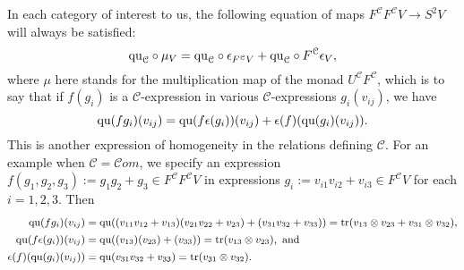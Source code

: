 \documentclass[11pt]{amsart}
\theoremstyle{plain}
\theoremstyle{definition}
\DeclareMathOperator{\trace}{tr}
\renewcommand{\to}{\longrightarrow}
\newcommand{\scrC}{\mathscr{C}}
\newcommand{\calc}{\mathcal{C}}
\theoremstyle{plain}
\newcommand{\quadratic}{\textup{qu}}
\newcommand{\algs}{{\scrC\!\textit{om}}}
\begin{document}
\begin{CPiAlgs and CHalgs}
In each category of interest to us, the following equation of maps $F^\calc F^\calc V\to S^2 V$ will always be satisfied:
\[\quadratic_\calc\circ\mu_V=\quadratic_\calc\circ \epsilon_{F^\calc V} +\quadratic_\calc\circ {F^\calc \epsilon_V},\]
where $\mu$ here stands for the multiplication map of the monad $U^\calc F^\calc $, which is to say that if  $f(g_i)$ is a $\calc$-expression in various $\calc$-expressions $g_i(v_{ij})$, we have 
\[\quadratic(fg_i)(v_{ij})=\quadratic(f\epsilon(g_i))(v_{ij})+\epsilon(f)(\quadratic(g_i)(v_{ij})).\]
This is another expression of homogeneity in the relations defining $\calc$. For an example when $\calc=\algs$, we specify an expression $f(g_1,g_2,g_3):=g_1g_2+g_3\in F^\calc F^\calc V$ in expressions $g_i:=v_{i1}v_{i2}+v_{i3}\in F^\calc V$ for each $i=1,2,3$. Then
\begin{alignat*}{2}
\textup{\small$\quadratic(fg_i)(v_{ij})={}$}
&
\textup{\small$\quadratic((v_{11}v_{12}+v_{13})(v_{21}v_{22}+v_{23})+(v_{31}v_{32}+v_{33}))=\trace(v_{13}\otimes v_{23}+v_{31}\otimes v_{32}),$}
\\
\textup{\small$\quadratic(f\epsilon(g_i))(v_{ij})={}$}
&
\textup{\small$\quadratic((v_{13})(v_{23})+(v_{33}))=\trace(v_{13}\otimes v_{23}),\textup{ and}$}
\\
\textup{\small$\epsilon(f)(\quadratic(g_i)(v_{ij}))={}$}
&
\textup{\small$\quadratic(v_{31}v_{32}+v_{33})=\trace(v_{31}\otimes v_{32}).$}
\end{alignat*}










\end{CPiAlgs and CHalgs}
\end{document}
